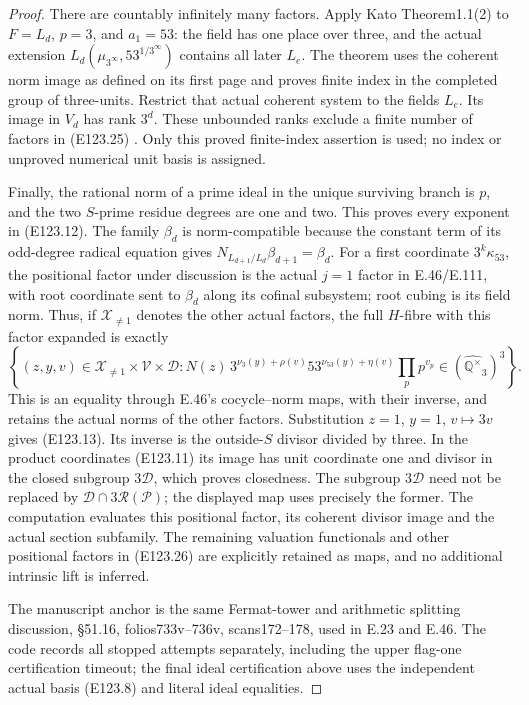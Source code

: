\begin{proof}
There are countably infinitely many factors. Apply Kato
Theorem1.1(2) to $F=L_d$, $p=3$, and $a_1=53$:
the field has one place over three, and the actual extension
$L_d(\mu_{3^\infty},53^{1/3^\infty})$ contains all later $L_e$.
The theorem uses the coherent norm image as defined on its
first page and proves finite index in the completed group
of three-units. Restrict that actual coherent system to the
fields $L_e$. Its image in $V_d$ has rank $3^d$.
These unbounded ranks exclude a finite number of factors in
(E123.25) \cite{E_KatoUniversalNorms}.
Only this proved finite-index assertion is used; no index
or unproved numerical unit basis is assigned.

Finally, the rational norm of a prime ideal in the unique
surviving branch is $p$, and the two $S$-prime residue degrees
are one and two. This proves every exponent in (E123.12).
The family $\beta_d$ is norm-compatible because the constant
term of its odd-degree radical equation gives
$N_{L_{d+1}/L_d}\beta_{d+1}=\beta_d$.
For a first coordinate $3^k\kappa_{53}$, the positional
factor under discussion is the actual $j=1$ factor in
E.46/E.111, with root coordinate sent to $\beta_d$ along its
cofinal subsystem; root cubing is its field norm.
Thus, if $\mathcal X_{\ne1}$ denotes the other actual factors,
the full $H$-fibre with this factor expanded is exactly
\[
 \left\{(z,y,v)\in\mathcal X_{\ne1}\times\mathcal V\times\mathcal D:
 N(z)\,3^{\nu_3(y)+\rho(v)}53^{\nu_{53}(y)+\eta(v)}
               \prod_pp^{v_p}\in
                  (\widehat{\mathbb Q^\times}_3)^3\right\}.
 \tag{E123.26}
\]
This is an equality through E.46's cocycle--norm maps, with
their inverse, and retains the actual norms of the other
factors. Substitution $z=1$, $y=1$, $v\mapsto3v$
gives (E123.13). Its inverse is the outside-$S$ divisor divided
by three. In the product coordinates (E123.11) its image has
unit coordinate one and divisor in the closed subgroup
$3\mathcal D$, which proves closedness.
The subgroup $3\mathcal D$ need not be replaced by
$\mathcal D\cap3\mathcal R(\mathcal P)$; the displayed map
uses precisely the former. The computation evaluates this
positional factor, its coherent divisor image and the actual
section subfamily. The remaining valuation functionals and
other positional factors in (E123.26) are explicitly retained
as maps, and no additional intrinsic lift is inferred.

The manuscript anchor is the same Fermat-tower and arithmetic
splitting discussion, \S51.16, folios733v--736v, scans172--178,
used in E.23 and E.46. The code records all stopped attempts
separately, including the upper flag-one certification timeout;
the final ideal certification above uses the independent actual
basis (E123.8) and literal ideal equalities.
\end{proof}


